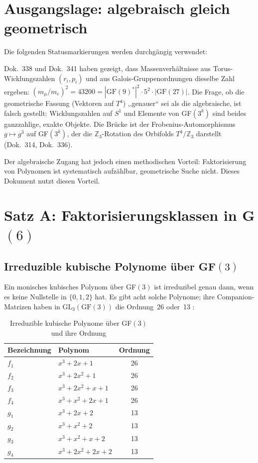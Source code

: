 \section{Ausgangslage: algebraisch gleich geometrisch}

Die folgenden Statusmarkierungen werden durchgängig verwendet:


Dok.~338 und Dok.~341 haben gezeigt, dass Massenverhältnisse aus
Torus-Wicklungszahlen $(r_i, p_i)$ und aus Galois-Gruppenordnungen dieselbe
Zahl ergeben: $(m_\mu/m_e)^2 = 43200 = |\text{GF}(9)^*|^2 \cdot 5^2 \cdot |\text{GF}(27)|$.
Die Frage, ob die geometrische Fassung (Vektoren auf $T^4$) ,,genauer`` sei als die
algebraische, ist falsch gestellt: Wicklungszahlen auf $S^1$ und Elemente von
GF$(3^k)$ sind beides ganzzahlige, exakte Objekte. Die Brücke ist der
Frobenius-Automorphismus $g \mapsto g^3$ auf GF$(3^k)$, der die $\mathbb{Z}_3$-Rotation
des Orbifolds $T^4/\mathbb{Z}_3$ darstellt (Dok.~314, Dok.~336).

Der algebraische Zugang hat jedoch einen methodischen Vorteil: Faktorisierung von
Polynomen ist systematisch aufzählbar, geometrische Suche nicht. Dieses Dokument
nutzt diesen Vorteil.

\section{Satz A: Faktorisierungsklassen in G$(6)$}

\subsection{Irreduzible kubische Polynome über GF$(3)$}

Ein monisches kubisches Polynom über GF$(3)$ ist irreduzibel genau dann, wenn es
keine Nullstelle in $\{0,1,2\}$ hat. Es gibt acht solche Polynome; ihre
Companion-Matrizen haben in $\text{GL}_3(\text{GF}(3))$ die Ordnung~26 oder~13 \BM:

\begin{table}[H]
\centering
\caption{Irreduzible kubische Polynome über GF$(3)$ und ihre Ordnung}
\begin{tabular}{llc}
\toprule
Bezeichnung & Polynom & Ordnung \\
\midrule
$f_1$ & $x^3 + 2x + 1$ & 26 \\
$f_2$ & $x^3 + 2x^2 + 1$ & 26 \\
$f_3$ & $x^3 + 2x^2 + x + 1$ & 26 \\
$f_4$ & $x^3 + x^2 + 2x + 1$ & 26 \\
\midrule
$g_1$ & $x^3 + 2x + 2$ & 13 \\
$g_2$ & $x^3 + x^2 + 2$ & 13 \\
$g_3$ & $x^3 + x^2 + x + 2$ & 13 \\
$g_4$ & $x^3 + 2x^2 + 2x + 2$ & 13 \\
\bottomrule
\end{tabular}
\end{table}

